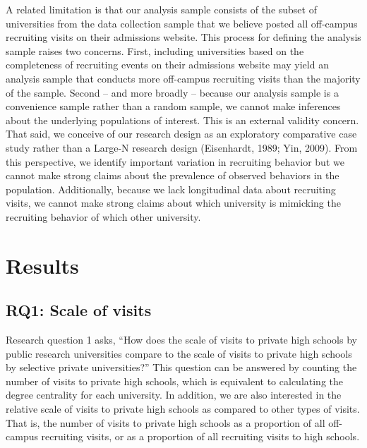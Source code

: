 \documentclass[
  12pt,
]{article}
\begin{document}
A related limitation is that our analysis sample consists of the subset of universities from the data collection sample that we believe posted all off-campus recruiting visits on their admissions website. This process for defining the analysis sample raises two concerns. First, including universities based on the completeness of recruiting events on their admissions website may yield an analysis sample that conducts more off-campus recruiting visits than the majority of the sample. Second -- and more broadly -- because our analysis sample is a convenience sample rather than a random sample, we cannot make inferences about the underlying populations of interest. This is an external validity concern. That said, we conceive of our research design as an exploratory comparative case study rather than a Large-N research design (Eisenhardt, 1989; Yin, 2009). From this perspective, we identify important variation in recruiting behavior but we cannot make strong claims about the prevalence of observed behaviors in the population. Additionally, because we lack longitudinal data about recruiting visits, we cannot make strong claims about which university is mimicking the recruiting behavior of which other university.

\section{Results}\label{results}

\subsection{RQ1: Scale of visits}\label{rq1-scale-of-visits}

Research question 1 asks, ``How does the scale of visits to private high schools by public research universities compare to the scale of visits to private high schools by selective private universities?'' This question can be answered by counting the number of visits to private high schools, which is equivalent to calculating the degree centrality for each university. In addition, we are also interested in the relative scale of visits to private high schools as compared to other types of visits. That is, the number of visits to private high schools as a proportion of all off-campus recruiting visits, or as a proportion of all recruiting visits to high schools.
\end{document}
